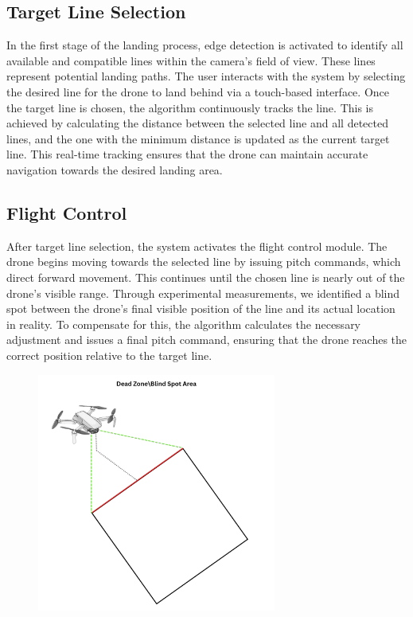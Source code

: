 \documentclass[3p,times]{elsarticle}
\begin{document}
\subsection{Target Line Selection}
In the first stage of the landing process, edge detection is activated to identify all available and compatible lines within the camera's field of view. These lines represent potential landing paths. The user interacts with the system by selecting the desired line for the drone to land behind via a touch-based interface. Once the target line is chosen, the algorithm continuously tracks the line. This is achieved by calculating the distance between the selected line and all detected lines, and the one with the minimum distance is updated as the current target line. This real-time tracking ensures that the drone can maintain accurate navigation towards the desired landing area.

\subsection{Flight Control}
After target line selection, the system activates the flight control module. The drone begins moving towards the selected line by issuing pitch commands, which direct forward movement. This continues until the chosen line is nearly out of the drone’s visible range. Through experimental measurements, we identified a blind spot between the drone's final visible position of the line and its actual location in reality. To compensate for this, the algorithm calculates the necessary adjustment and issues a final pitch command, ensuring that the drone reaches the correct position relative to the target line.

\begin{figure}[H]
    \centering
    \includegraphics[width=0.7\textwidth]{Blind Spot Area.png}  %
    \label{fig:Blind Spot Area.}
\end{figure}
\end{document}
